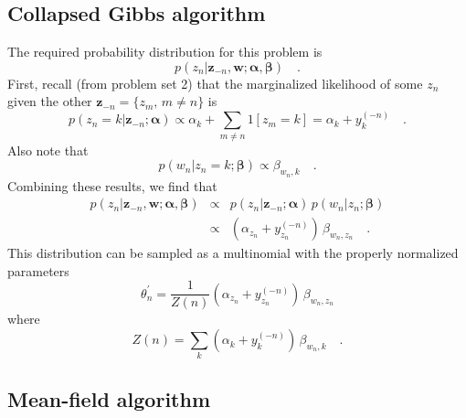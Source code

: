 \documentclass[11pt]{article}
\newcommand{\pr}[1]{\ensuremath{p(#1)}}
\newcommand{\bvec}[1]{\ensuremath{\boldsymbol{#1}}}
\newcommand{\z}{\bvec{z}}
\newcommand{\w}{\bvec{w}}
\newcommand{\ala}{\bvec{\alpha}}
\newcommand{\ba}{\bvec{\beta}}
\begin{document}
\subsection{Collapsed Gibbs algorithm}

The required probability distribution for this problem is
\begin{equation}
    \pr{z_n | \bvec{z}_{-n}, \w; \ala, \ba} \quad .
\end{equation}
First, recall (from problem set 2) that the marginalized likelihood of some
$z_n$ given the other $\z_{-n} = \{ z_m, \, m \ne n\}$ is
\begin{equation}
    \pr{z_n = k | \z_{-n}; \ala} \propto \alpha_k +
    \sum_{m \ne n} 1[z_m = k] = \alpha_k + y_k^{(-n)} \quad .
\end{equation}
Also note that
\begin{equation}
    \pr{w_n | z_n = k; \ba} \propto \beta_{w_n, k} \quad .
\end{equation}
Combining these results, we find that
\begin{eqnarray}
    \pr{z_n | \bvec{z}_{-n}, \w; \ala, \ba} & \propto &
        \pr{z_n | \z_{-n}; \ala} \, \pr{w_n | z_n ; \ba} \\
        & \propto & (\alpha_{z_n} + y_{z_n}^{(-n)}) \, \beta_{w_n, z_n}
        \quad .
\end{eqnarray}
This distribution can be sampled as a multinomial with the properly
normalized parameters
\begin{equation}
    \theta_n^\prime = \frac{1}{Z(n)} (\alpha_{z_n} + y_{z_n}^{(-n)}) \,
        \beta_{w_n, z_n}
\end{equation}
where
\begin{equation}
    Z(n) = \sum_{k} (\alpha_{k} + y_{k}^{(-n)}) \,
        \beta_{w_n, k} \quad .
\end{equation}

\subsection{Mean-field algorithm}
\end{document}

